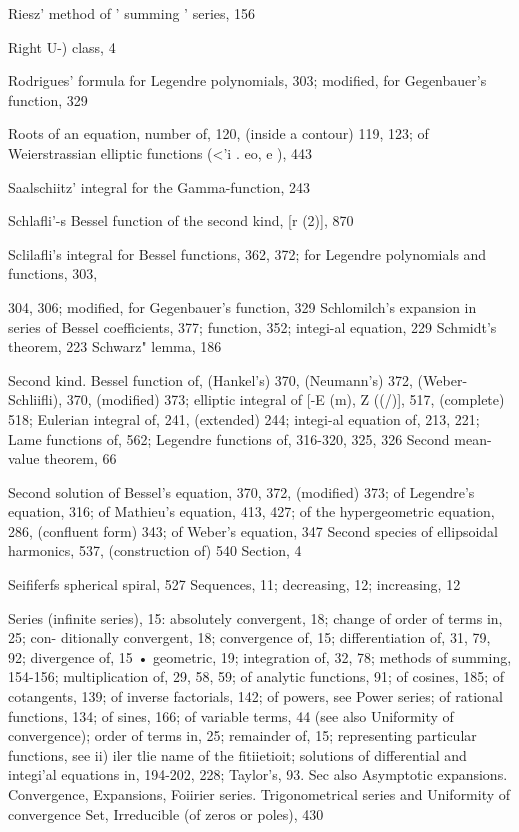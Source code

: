 Riesz' method of ' summing ' series, 156

Right  U-) class, 4

Rodrigues' formula for Legendre polynomials, 303; modified, for Gegenbauer's function, 329

Roots of an equation, number of, 120, (inside a contour) 119, 123; of Weierstrassian elliptic
functions (<'i . eo, e ), 443

Saalschiitz' integral for the Gamma-function, 243

Schlafli'-s Bessel function of the second kind, [r  (2)], 870

Sclilafli's integral for Bessel functions, 362, 372; for Legendre polynomials and functions, 303,

304, 306; modified, for Gegenbauer's function, 329
Schlomilch's expansion in series of Bessel coefficients, 377; function, 352; integi-al equation, 229
Schmidt's theorem, 223
Schwarz" lemma, 186

Second kind. Bessel function of, (Hankel's) 370, (Neumann's) 372, (Weber-Schliifli), 370,
(modified) 373; elliptic integral of [-E (m), Z ((/)], 517, (complete) 518; Eulerian integral of,
241, (extended) 244; integi-al equation of, 213, 221; Lame functions of, 562; Legendre
functions of, 316-320, 325, 326
Second mean-value theorem, 66

Second solution of Bessel's equation, 370, 372, (modified) 373; of Legendre's equation, 316; of
Mathieu's equation, 413, 427; of the hypergeometric equation, 286, (confluent form) 343; of
Weber's equation, 347
Second species of ellipsoidal harmonics, 537, (construction of) 540
Section, 4

Seififerfs spherical spiral, 527
Sequences, 11; decreasing, 12; increasing, 12

Series (infinite series), 15: absolutely convergent, 18; change of order of terms in, 25; con-
ditionally convergent, 18; convergence of, 15; differentiation of, 31, 79, 92; divergence of,
15 • geometric, 19; integration of, 32, 78; methods of summing, 154-156; multiplication
of, 29, 58, 59; of analytic functions, 91; of cosines, 185; of cotangents, 139; of inverse
factorials, 142; of powers, see Power series; of rational functions, 134; of sines, 166; of
variable terms, 44 (see also Uniformity of convergence); order of terms in, 25; remainder of,
15; representing particular functions, see ii) iler tlie name of the fitiietioit; solutions of
differential and integi'al equations in, 194-202, 228; Taylor's, 93. Sec also Asymptotic
expansions. Convergence, Expansions, Foiirier series. Trigonometrical series and Uniformity
of convergence
Set, Irreducible (of zeros or poles), 430

